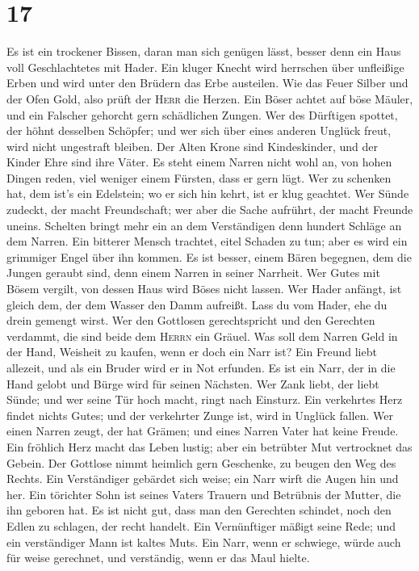 \hypertarget{section-16}{%
\section{17}\label{section-16}}

 Es ist ein trockener Bissen, daran man sich genügen
lässt, besser denn ein Haus voll Geschlachtetes mit Hader.
 Ein kluger Knecht wird herrschen über unfleißige Erben
und wird unter den Brüdern das Erbe austeilen.  Wie das
Feuer Silber und der Ofen Gold, also prüft der \textsc{Herr} die Herzen.
 Ein Böser achtet auf böse Mäuler, und ein Falscher
gehorcht gern schädlichen Zungen.  Wer des Dürftigen
spottet, der höhnt desselben Schöpfer; und wer sich über eines anderen
Unglück freut, wird nicht ungestraft bleiben.  Der Alten
Krone sind Kindeskinder, und der Kinder Ehre sind ihre Väter.
 Es steht einem Narren nicht wohl an, von hohen Dingen
reden, viel weniger einem Fürsten, dass er gern lügt.  Wer
zu schenken hat, dem ist's ein Edelstein; wo er sich hin kehrt, ist er
klug geachtet.  Wer Sünde zudeckt, der macht Freundschaft;
wer aber die Sache aufrührt, der macht Freunde uneins. 
Schelten bringt mehr ein an dem Verständigen denn hundert Schläge an dem
Narren.  Ein bitterer Mensch trachtet, eitel Schaden zu
tun; aber es wird ein grimmiger Engel über ihn kommen. 
Es ist besser, einem Bären begegnen, dem die Jungen geraubt sind, denn
einem Narren in seiner Narrheit.  Wer Gutes mit Bösem
vergilt, von dessen Haus wird Böses nicht lassen.  Wer
Hader anfängt, ist gleich dem, der dem Wasser den Damm aufreißt. Lass du
vom Hader, ehe du drein gemengt wirst.  Wer den Gottlosen
gerechtspricht und den Gerechten verdammt, die sind beide dem
\textsc{Herrn} ein Gräuel.  Was soll dem Narren Geld in
der Hand, Weisheit zu kaufen, wenn er doch ein Narr ist? 
Ein Freund liebt allezeit, und als ein Bruder wird er in Not erfunden.
 Es ist ein Narr, der in die Hand gelobt und Bürge wird
für seinen Nächsten.  Wer Zank liebt, der liebt Sünde;
und wer seine Tür hoch macht, ringt nach Einsturz.  Ein
verkehrtes Herz findet nichts Gutes; und der verkehrter Zunge ist, wird
in Unglück fallen.  Wer einen Narren zeugt, der hat
Grämen; und eines Narren Vater hat keine Freude.  Ein
fröhlich Herz macht das Leben lustig; aber ein betrübter Mut vertrocknet
das Gebein.  Der Gottlose nimmt heimlich gern Geschenke,
zu beugen den Weg des Rechts.  Ein Verständiger gebärdet
sich weise; ein Narr wirft die Augen hin und her.  Ein
törichter Sohn ist seines Vaters Trauern und Betrübnis der Mutter, die
ihn geboren hat.  Es ist nicht gut, dass man den
Gerechten schindet, noch den Edlen zu schlagen, der recht handelt.
 Ein Vernünftiger mäßigt seine Rede; und ein verständiger
Mann ist kaltes Muts.  Ein Narr, wenn er schwiege, würde
auch für weise gerechnet, und verständig, wenn er das Maul hielte.

